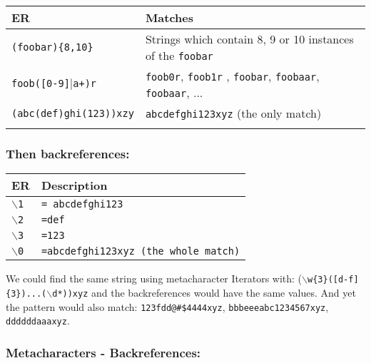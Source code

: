 \begin{footnotesize}
  \begin{tabularx}{\textwidth}{>{\hsize=0.3\hsize}X>{\hsize=0.7\hsize}X}\\
    \hline
    \textbf{ER} & \textbf{Matches} \\
    \hline
    \texttt{(foobar)\{8,10\}} & Strings which contain 8, 9 or 10 instances of the \texttt{foobar} \\
    \texttt{foob([0-9]$|$a+)r} & \texttt{foob0r}, \texttt{foob1r} , \texttt{foobar}, \texttt{foobaar}, \texttt{foobaar}, ... \\
    \texttt{(abc(def)ghi(123))xzy} & \texttt{abcdefghi123xyz} (the only match) \\
    \hline
    \\
  \end{tabularx}
\end{footnotesize}


\subsubsection{Then backreferences:}

\begin{footnotesize}
  \begin{tabularx}{\textwidth}{>{\hsize=0.3\hsize}X>{\hsize=0.7\hsize}X}\\
    \hline
    \textbf{ER} & \textbf{Description} \\
    \hline
    \texttt{$\backslash$1} & \texttt{= abcdefghi123} \\
    \texttt{$\backslash$2} & \texttt{=def} \\
    \texttt{$\backslash$3} & \texttt{=123} \\
    \texttt{$\backslash$0} & \texttt{=abcdefghi123xyz (the whole match)} \\
    \hline
  \end{tabularx}
\end{footnotesize}

We could find the same string using metacharacter Iterators with:
(\texttt{$\backslash$w\{3\}([d-f]\{3\})...($\backslash$d*))xyz} and the
backreferences would have the same values. And yet the pattern would
also match: \texttt{123fdd@\#\$4444xyz}, \texttt{bbbeeeabc1234567xyz},
\texttt{ddddddaaaxyz}.


\subsubsection{Metacharacters - Backreferences:}

